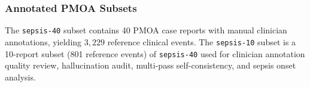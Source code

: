 \subsubsection{Annotated PMOA Subsets}
\label{ch06:apd:subset_ids}

The \texttt{sepsis-40} subset contains 40 PMOA case reports with manual clinician annotations, yielding $3,229$ reference clinical events.
The \texttt{sepsis-10} subset is a 10-report subset (801 reference events) of \texttt{sepsis-40} used for clinician annotation quality review, hallucination audit, multi-pass self-consistency, and sepsis onset analysis.




